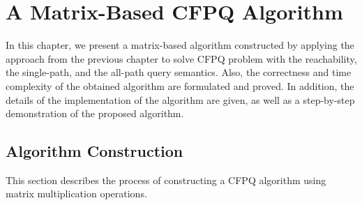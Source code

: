 \chapter{A Matrix-Based CFPQ Algorithm}\label{ch:ch3}
In this chapter, we present a matrix-based algorithm constructed by applying the approach from the previous chapter to solve CFPQ problem with the reachability, the single-path, and the all-path query semantics. Also, the correctness and time complexity of the obtained algorithm are formulated and proved. In addition, the details of the implementation of the algorithm are given, as well as a step-by-step demonstration of the proposed algorithm.
\section{Algorithm Construction}\label{sec:ch3/sect1}
This section describes the process of constructing a CFPQ algorithm using matrix multiplication operations.

